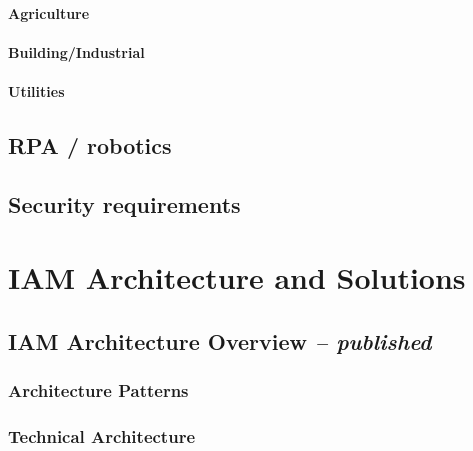 \hypertarget{agriculture}{%
\subsubsection{Agriculture}\label{agriculture}}

\hypertarget{buildingindustrial}{%
\subsubsection{Building/Industrial}\label{buildingindustrial}}

\hypertarget{utilities}{%
\subsubsection{Utilities}\label{utilities}}

\hypertarget{rpa-robotics}{%
\section{RPA / robotics}\label{rpa-robotics}}

\hypertarget{security-requirements}{%
\section{Security requirements}\label{security-requirements}}

\hypertarget{iam-architecture-and-solutions}{%
\chapter{IAM Architecture and Solutions
}\label{iam-architecture-and-solutions}}

\hypertarget{iam-architecture-overview-published}{%
\section{\texorpdfstring{IAM Architecture Overview \emph{--
published}}{IAM Architecture Overview -- published}}\label{iam-architecture-overview-published}}

\hypertarget{architecture-patterns}{%
\subsection{Architecture Patterns }\label{architecture-patterns}}

\hypertarget{technical-architecture}{%
\subsection{Technical Architecture }\label{technical-architecture}}

